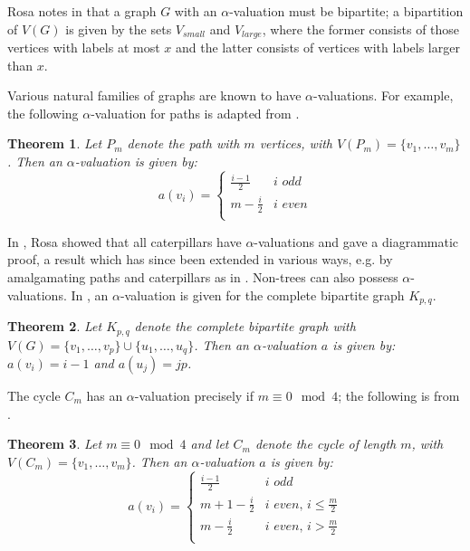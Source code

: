 \documentclass[12pt, a4paper]{article}
\newtheorem{theorem}{Theorem}[section]
\theoremstyle{definition}
\begin{document}
Rosa notes in \cite{Rosa} that a graph $G$ with an $\alpha$-valuation must be bipartite; a bipartition of $V(G)$ is given by the sets $V_{small}$ and $V_{large}$, where the former consists of those vertices with
labels at most $x$ and the latter consists of vertices with labels larger than $x$.

Various natural families of graphs are known to have $\alpha$-valuations. For example, the following $\alpha$-valuation for paths is adapted from \cite{BloHsu}. 
\begin{theorem}\label{pathalpha}
Let $P_m$ denote the path with $m$ vertices, with $V(P_m)=\{v_1,\ldots,v_m\}$.  Then an $\alpha$-valuation is given by:
\[a(v_i) = \begin{cases} 
          \frac{i-1}{2} & i \textit{ odd} \\
          m- \frac{i}{2} & i \textit{ even} \\
\end{cases}
\]
\end{theorem}
In \cite{Rosa}, Rosa showed that all caterpillars have $\alpha$-valuations and gave a diagrammatic proof, a result which has since been extended in various ways, e.g. by amalgamating paths and caterpillars as in \cite{Barrientos}.  Non-trees can also possess $\alpha$-valuations. In \cite{Rosa}, an $\alpha$-valuation is given for the complete bipartite graph $K_{p,q}$.
\begin{theorem}
Let $K_{p,q}$ denote the complete bipartite graph with $V(G)=\{v_1,\ldots,v_p\} \cup \{u_1,\ldots, u_q\}$.
Then an $\alpha$-valuation $a$ is given by: $a(v_i)=i-1$ and $a(u_j)=jp$.
\end{theorem}

The cycle $C_m$ has an $\alpha$-valuation precisely if $m \equiv 0 \mod 4$; the following is from \cite{PatStiCEDF}.
\begin{theorem}\label{cyc}
Let $m \equiv 0 \mod 4$ and let $C_m$ denote the cycle of length $m$, with $V(C_m)=\{v_1,\ldots,v_m\}$.  Then an $\alpha$-valuation $a$ is given by:
\[a(v_i) = \begin{cases} 
          \frac{i-1}{2} & i \textit{ odd} \\
          m +1- \frac{i}{2} & i \textit{ even, }i \leq \frac{m}{2} \\
          m - \frac{i}{2} & i \textit{ even, }i > \frac{m}{2} \\
       \end{cases}
    \]
\end{theorem}
\end{document}
